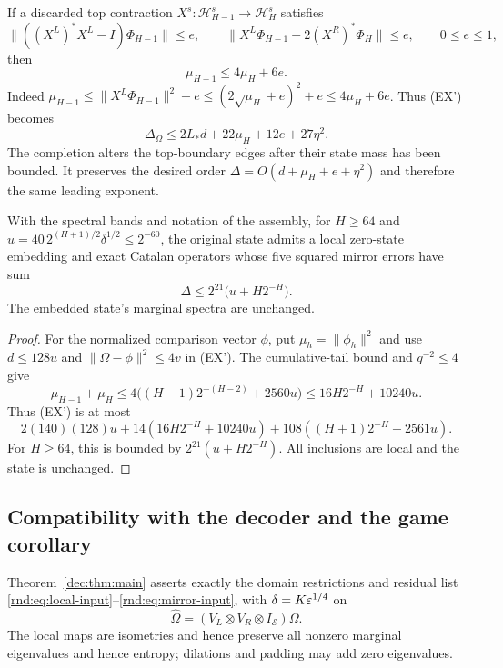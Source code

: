 \begin{remark}
If a discarded top contraction $X^s:\mathcal H_{H-1}^s\to\mathcal H_H^s$ satisfies
\[
 \|((X^L)^*X^L-I)\Phi_{H-1}\|\le e,\qquad
 \|X^L\Phi_{H-1}-2(X^R)^*\Phi_H\|\le e,\qquad0\le e\le1,
\]
then
\[
 \mu_{H-1}\le4\mu_H+6e.
\]
Indeed $\mu_{H-1}\le\|X^L\Phi_{H-1}\|^2+e\le(2\sqrt{\mu_H}+e)^2+e\le4\mu_H+6e$. Thus (EX') becomes
\[
 \Delta_\Omega\le2L_*d+22\mu_H+12e+27\eta^2.
\]
The completion alters the top-boundary edges after their state mass has been bounded. It preserves the desired order $\Delta=O(d+\mu_H+e+\eta^2)$ and therefore the same leading exponent.
\end{remark}

\begin{corollary}
With the spectral bands and notation of the assembly, for $H\ge64$ and $u=40\,2^{(H+1)/2}\delta^{1/2}\le2^{-60}$, the original state admits a local zero-state embedding and exact Catalan operators whose five squared mirror errors have sum
\[
 \Delta\le 2^{21}\bigl(u+H2^{-H}\bigr).
\]
The embedded state's marginal spectra are unchanged.
\end{corollary}
\begin{proof}
For the normalized comparison vector $\phi$, put $\mu_h=\|\phi_h\|^2$ and use $d\le128u$ and $\|\Omega-\phi\|^2\le4v$ in \textup{(EX')}. The cumulative-tail bound and $q^{-2}\le4$ give
\[
 \mu_{H-1}+\mu_H\le4\bigl((H-1)2^{-(H-2)}+2560u\bigr)
 \le16H2^{-H}+10240u.
\]
Thus \textup{(EX')} is at most
\[
 2(140)(128)u+14(16H2^{-H}+10240u)
       +108((H+1)2^{-H}+2561u).
\]
For $H\ge64$, this is bounded by $2^{21}(u+H2^{-H})$. All inclusions are local and the state is unchanged.
\end{proof}

\subsection{Compatibility with the decoder and the game corollary}\label{rnd:sec:decoder}
Theorem~\ref{dec:thm:main} asserts exactly the domain restrictions and residual list \eqref{rnd:eq:local-input}--\eqref{rnd:eq:mirror-input}, with $\delta=K\varepsilon^{1/4}$ on
\[
 \widehat\Omega=(V_L\otimes V_R\otimes I_{\mathcal E})\Omega.
\]
The local maps are isometries and hence preserve all nonzero marginal eigenvalues and hence entropy; dilations and padding may add zero eigenvalues.


